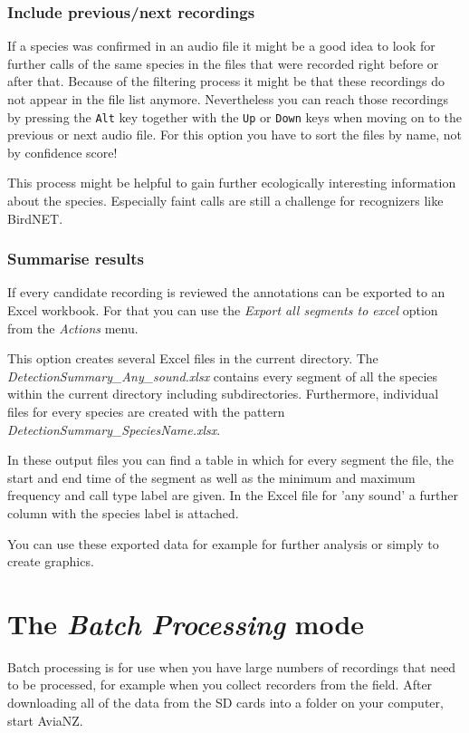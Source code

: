 \documentclass{scrartcl}
\begin{document}
\subsubsection{Include previous/next recordings}
If a species was confirmed in an audio file it might be a good idea to look for further calls of the same species in the files that were recorded right before or after that.
Because of the filtering process it might be that these recordings do not appear in the file list anymore. 
Nevertheless you can reach those recordings by pressing the \texttt{Alt} key together with the \texttt{Up} or \texttt{Down} keys when moving on to the previous or next audio file.
For this option you have to sort the files by name, not by confidence score! 

This process might be helpful to gain further ecologically interesting information about the species.
Especially faint calls are still a challenge for recognizers like BirdNET.

\subsubsection{Summarise results}
If every candidate recording is reviewed the annotations can be exported to an Excel workbook.
For that you can use the \textit{Export all segments to excel} option from the \textit{Actions} menu.

This option creates several Excel files in the current directory.
The \textit{DetectionSummary\_Any\_sound.xlsx} contains every segment of all the species within the current directory including subdirectories. 
Furthermore, individual files for every species are created with the pattern \textit{DetectionSummary\_SpeciesName.xlsx}.

In these output files you can find a table in which for every segment the file, the start and end time of the segment as well as the minimum and maximum frequency and call type label are given.
In the Excel file for 'any sound' a further column with the species label is attached.

You can use these exported data for example for further analysis or simply to create graphics.
\section{The \textit{Batch Processing} mode}
\label{sec:auto}

Batch processing is for use when you have large numbers of recordings that need to be processed, for example when you collect recorders from the field. After downloading all of the data from the SD cards into a folder on your computer, start AviaNZ. 
\end{document}
